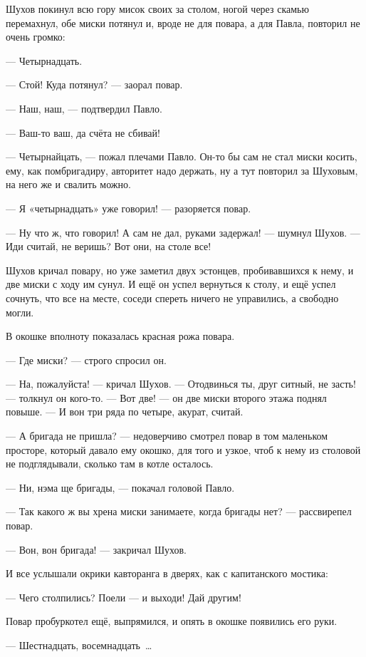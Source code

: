 Шухов покинул всю гору мисок своих за столом, ногой через скамью перемахнул, обе миски 
потянул и, вроде не для повара, а для Павла, повторил не очень громко:

--- Четырнадцать.

--- Стой! Куда потянул? --- заорал повар.

--- Наш, наш, --- подтвердил Павло.

--- Ваш-то ваш, да счёта не сбивай!

--- Четырнайцать, --- пожал плечами Павло. Он-то бы сам не стал миски косить, ему, как 
помбригадиру, авторитет надо держать, ну а тут повторил за Шуховым, на него же и свалить 
можно.

--- Я «четырнадцать» уже говорил! --- разоряется повар.

--- Ну что ж, что говорил! А сам не дал, руками задержал! --- шумнул Шухов. --- Иди считай, не веришь? 
Вот они, на столе все!

Шухов кричал повару, но уже заметил двух эстонцев, пробивавшихся к нему, и две миски с ходу им 
сунул. И ещё он успел вернуться к столу, и ещё успел сочнуть, что все на месте, соседи спереть 
ничего не управились, а свободно могли.

В окошке вполноту показалась красная рожа повара.

--- Где миски? --- строго спросил он.

--- На, пожалуйста! --- кричал Шухов. --- Отодвинься ты, друг ситный, не засть! --- толкнул он 
кого-то. --- Вот две! --- он две миски второго этажа поднял повыше. --- И вон три ряда по четыре, 
акурат, считай.

--- А бригада не пришла? --- недоверчиво смотрел повар в том маленьком просторе, который давало 
ему окошко, для того и узкое, чтоб к нему из столовой не подглядывали, сколько там в котле 
осталось.

--- Ни, нэма ще бригады, --- покачал головой Павло.

--- Так какого ж вы хрена миски занимаете, когда бригады нет? --- рассвирепел повар.

--- Вон, вон бригада! --- закричал Шухов.

И все услышали окрики кавторанга в дверях, как с капитанского мостика:

--- Чего столпились? Поели --- и выходи! Дай другим!

Повар пробуркотел ещё, выпрямился, и опять в окошке появились его руки.

--- Шестнадцать, восемнадцать~\dots{}

